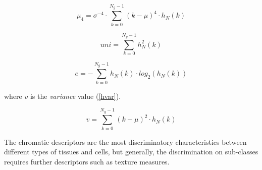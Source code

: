 \begin{equation}\label{hkurt}
\mu_4 =\sigma^{-4} \cdot \sum_{k=0}^{N_{g}-1} (k - \mu)^4 \cdot h_N(k)
\end{equation}

\begin{equation}\label{huni}
uni=\sum_{k=0}^{N_{g}-1} h_N ^2 (k)
\end{equation}

\begin{equation}\label{hent}
e=-\sum_{k=0}^{N_{g}-1}  h_N(k) \cdot  log_2(h_N(k))
\end{equation}

where $v$ is the \textit{variance} value (\ref{hvar}). 

\begin{equation}\label{hvar}
v=\sum_{k=0}^{N_{g}-1} (k - \mu)^2 \cdot h_N(k)
\end{equation}

The chromatic descriptors are the most discriminatory characteristics between different types of tissues and cells, but generally, the discrimination on sub-classes requires further descriptors such as texture measures.

